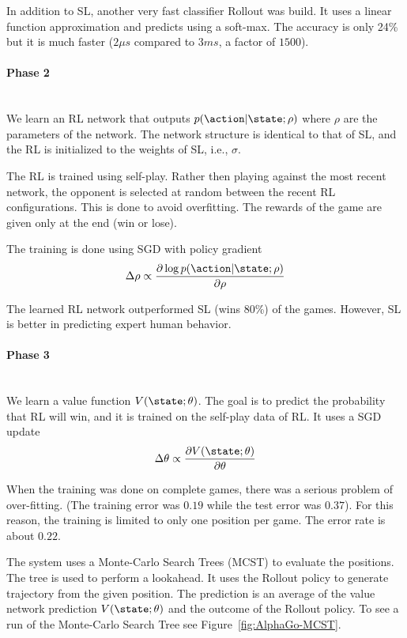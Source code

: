In addition to SL, another very fast classifier Rollout was build.
It uses a linear function approximation and predicts using a
soft-max. The accuracy is only 24\% but it is much faster ($2\mu s$
compared to $3ms$,  a factor of $1500$).

\paragraph{Phase 2}\ \\
We learn an RL network that outputs $p(\action|\state;\rho)$ where
$\rho$ are the parameters of the network. The network structure is
identical to that of SL, and the RL is initialized to the weights of
SL, i.e., $\sigma$.

The RL is trained using self-play. Rather then playing against the
most recent network, the opponent is selected at random between the
recent RL configurations. This is done to avoid overfitting. The
rewards of the game are given only at the end (win or lose).

The training is done using SGD with policy gradient
\[
\Delta \rho \propto \frac{\partial \log
p(\action|\state;\rho)}{\partial \rho}
\]

The learned RL network outperformed SL (wins 80\%) of the games.
However, SL is better in predicting expert human behavior.

\paragraph{Phase 3}\ \\
We learn a value function $V(\state;\theta)$. The goal is to predict
the probability that RL will win, and it is trained on the self-play
data of RL. It uses a SGD update
\[
\Delta \theta \propto \frac{\partial V(\state;\theta)}{\partial
\theta}
\]

When the training was done on complete games, there was a serious
problem of over-fitting. (The training error was $0.19$ while the
test error was $0.37$). For this reason, the training is limited to
only one position per game. The error rate is about $0.22$.

The system uses a Monte-Carlo Search Trees (MCST) to evaluate the
positions. The tree is used to perform a lookahead. It uses the
Rollout policy to generate trajectory from the given position. The
prediction is an average of the value network prediction
$V(\state;\theta)$ and the outcome of the Rollout policy. To see a
run of the Monte-Carlo Search Tree see
Figure~\ref{fig:AlphaGo-MCST}.


